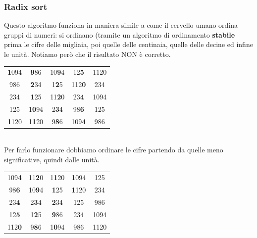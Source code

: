 \subsubsection{Radix sort}
Questo algoritmo funziona in maniera simile a come il cervello umano ordina gruppi di numeri: si ordinano (tramite un algoritmo di ordinamento \textbf{stabile} prima le cifre delle migliaia, poi quelle delle centinaia, quelle delle decine ed infine le unità. Notiamo però che il risultato NON è corretto.
\begin{table}[h]
	\centering
	\begin{tabular}{ccccc}
		\textbf{1}094 & \textbf{9}86 & 10\textbf{9}4 & 12\textbf{5} & 1120 \\
		986 & \textbf{2}34 & 1\textbf{2}5 & 112\textbf{0} & 234 \\
		234 & \textbf{1}25 & 11\textbf{2}0 & 23\textbf{4} & 1094 \\
		125 & 1\textbf{0}94 & 2\textbf{3}4 & 98\textbf{6} & 125 \\
		\textbf{1}120 & 1\textbf{1}20 & 9\textbf{8}6 & 109\textbf{4} & 986
	\end{tabular}
\end{table}
\\
Per farlo funzionare dobbiamo ordinare le cifre partendo da quelle meno significative, quindi dalle unità.
\begin{table}[h]
	\centering
	\begin{tabular}{ccccc}
		109\textbf{4} & 11\textbf{2}0 & 1\textbf{1}20& \textbf{1}094 & 125 \\
		98\textbf{6} & 10\textbf{9}4 & \textbf{1}25 & \textbf{1}120 & 234 \\
		23\textbf{4} & 2\textbf{3}4 & \textbf{2}34 & 125 & 986 \\
		12\textbf{5} & 1\textbf{2}5 & \textbf{9}86 & 234 & 1094 \\
		112\textbf{0} & 9\textbf{8}6 & 1\textbf{0}94 & 986 & 1120
	\end{tabular}
\end{table}